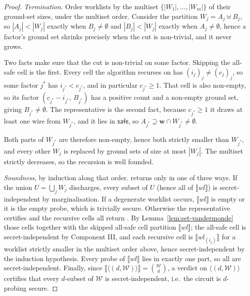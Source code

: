   \begin{proof}
  \emph{Termination.} Order worklists by the multiset $\{ |W_1|, \dots, |W_m| \}$
  of their ground-set sizes, under the multiset order. Consider the partition
  $W_j = A_j \uplus B_j$, so $|A_j| < |W_j|$ exactly when $B_j \neq \emptyset$ and
  $|B_j| < |W_j|$ exactly when $A_j \neq \emptyset$, hence a factor's ground set shrinks
  precisely when the cut is non-trivial, and it never grows.

  Two facts make sure that the cut is non-trivial on some factor. Skipping the all-safe cell is
  the first. Every cell the algorithm recurses on has $(i_j)_j \neq (c_j)_j$, so
  some factor $j^\ast$ has $i_{j^\ast} < c_{j^\ast}$, and in particular
  $c_{j^\ast} \geq 1$. That cell is also non-empty, so its factor
  $(c_{j^\ast} - i_{j^\ast},\, B_{j^\ast})$ has a positive count and a non-empty
  ground set, giving $B_{j^\ast} \neq \emptyset$. The representative is the second fact,
  because $c_{j^\ast} \geq 1$ it draws at least one wire from $W_{j^\ast}$, and it
  lies in $\mathsf{safe}$, so $A_{j^\ast} \supseteq \mathbf{w} \cap W_{j^\ast} \neq
  \emptyset$.

  Both parts of $W_{j^\ast}$ are therefore non-empty, hence both strictly smaller
  than $W_{j^\ast}$,
  and every other $W_j$ is replaced by ground sets of size at most $|W_j|$. The
  multiset strictly decreases, so the recursion is well founded.

  \emph{Soundness}, by induction along that order.  returns
  \Secure{} only in one of three ways. If the union $U = \bigcup_j W_j$
  discharges, every subset of $U$ (hence all of $\llbracket wl \rrbracket$)
  is secret-independent by marginalisation. If a degenerate worklist occurs,
  $\llbracket wl \rrbracket$ is empty or it is the empty probe, which is trivially secure.
  Otherwise the representative certifies and the recursive cells all return
  \Secure{}. By Lemma~\ref{lem:set-vandermonde} those cells together with the
  skipped all-safe cell partition $\llbracket wl \rrbracket$; the all-safe cell is
  secret-independent by Component III, and each recursive cell is
  $\llbracket wl_{(i_j)} \rrbracket$ for a worklist strictly smaller in the multiset
  order above, hence secret-independent by the induction hypothesis. Every probe of $\llbracket wl \rrbracket$ lies in
  exactly one part, so all are secret-independent. Finally, since
  $\llbracket \langle (d, \mathcal{W}) \rangle \rrbracket = \binom{\mathcal{W}}{d}$,
  a \Secure{} verdict on $\langle (d, \mathcal{W}) \rangle$ certifies that every $d$-subset
  of $\mathcal{W}$ is secret-independent, i.e.\ the circuit is $d$-probing secure.
  \end{proof}

